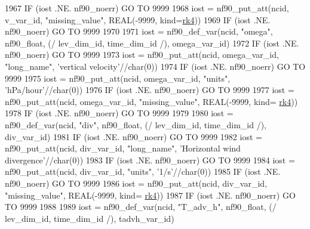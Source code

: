 \begin{DoxyCode}
1967     \textcolor{keywordflow}{IF} (iost .NE. nf90\_noerr) \textcolor{keywordflow}{GO TO} 9999
1968     iost    = nf90\_put\_att(ncid, v\_var\_id, \textcolor{stringliteral}{"missing\_value"}, \textcolor{keywordtype}{REAL}(-9999, kind=\hyperlink{namespaceportable_abaed22a509442771d3fba69bebda0b33}{rk4}))
1969     \textcolor{keywordflow}{IF} (iost .NE. nf90\_noerr) \textcolor{keywordflow}{GO TO} 9999
1970 
1971     iost    = nf90\_def\_var(ncid, \textcolor{stringliteral}{"omega"}, nf90\_float, (/ lev\_dim\_id, time\_dim\_id /), omega\_var\_id)
1972     \textcolor{keywordflow}{IF} (iost .NE. nf90\_noerr) \textcolor{keywordflow}{GO TO} 9999
1973     iost    = nf90\_put\_att(ncid, omega\_var\_id, \textcolor{stringliteral}{"long\_name"}, \textcolor{stringliteral}{'vertical velocity'}//char(0))
1974     \textcolor{keywordflow}{IF} (iost .NE. nf90\_noerr) \textcolor{keywordflow}{GO TO} 9999
1975     iost    = nf90\_put\_att(ncid, omega\_var\_id, \textcolor{stringliteral}{"units"}, \textcolor{stringliteral}{'hPa/hour'}//char(0))
1976     \textcolor{keywordflow}{IF} (iost .NE. nf90\_noerr) \textcolor{keywordflow}{GO TO} 9999
1977     iost    = nf90\_put\_att(ncid, omega\_var\_id, \textcolor{stringliteral}{"missing\_value"}, \textcolor{keywordtype}{REAL}(-9999, kind=
      \hyperlink{namespaceportable_abaed22a509442771d3fba69bebda0b33}{rk4}))
1978     \textcolor{keywordflow}{IF} (iost .NE. nf90\_noerr) \textcolor{keywordflow}{GO TO} 9999
1979 
1980     iost    = nf90\_def\_var(ncid, \textcolor{stringliteral}{"div"}, nf90\_float, (/ lev\_dim\_id, time\_dim\_id /), div\_var\_id)
1981     \textcolor{keywordflow}{IF} (iost .NE. nf90\_noerr) \textcolor{keywordflow}{GO TO} 9999
1982     iost    = nf90\_put\_att(ncid, div\_var\_id, \textcolor{stringliteral}{"long\_name"}, \textcolor{stringliteral}{'Horizontal wind divergence'}//char(0))
1983     \textcolor{keywordflow}{IF} (iost .NE. nf90\_noerr) \textcolor{keywordflow}{GO TO} 9999
1984     iost    = nf90\_put\_att(ncid, div\_var\_id, \textcolor{stringliteral}{"units"}, \textcolor{stringliteral}{'1/s'}//char(0))
1985     \textcolor{keywordflow}{IF} (iost .NE. nf90\_noerr) \textcolor{keywordflow}{GO TO} 9999
1986     iost    = nf90\_put\_att(ncid, div\_var\_id, \textcolor{stringliteral}{"missing\_value"}, \textcolor{keywordtype}{REAL}(-9999, kind=
      \hyperlink{namespaceportable_abaed22a509442771d3fba69bebda0b33}{rk4}))
1987     \textcolor{keywordflow}{IF} (iost .NE. nf90\_noerr) \textcolor{keywordflow}{GO TO} 9999
1988 
1989     iost    = nf90\_def\_var(ncid, \textcolor{stringliteral}{"T\_adv\_h"}, nf90\_float, (/ lev\_dim\_id, time\_dim\_id /), tadvh\_var\_id)

\end{DoxyCode}
